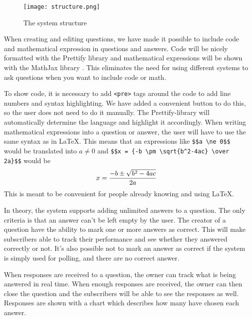 \begin{figure}[H]
\capstart
	\centering
		\texttt{[image: structure.png]}
	\caption[System Structure]{The system structure\label{fig:structure}}
\end{figure}

When creating and editing questions, we have made it possible to include code and mathematical expression in questions and answers. Code will be nicely formatted with the Prettify library \cite{google/code-prettify_2016} and mathematical expressions will be shown with the MathJax library \cite{mathjax_2016}. This eliminates the need for using different systems to ask questions when you want to include code or math. 

To show code, it is necessary to add \texttt{<pre>} tags around the code to add line numbers and syntax highlighting. We have added a convenient button to do this, so the user does not need to do it manually. The Prettify-library will automatically determine the language and highlight it accordingly. When writing mathematical expressions into a question or answer, the user will have to use the same syntax as in \LaTeX. This means that an expressions like \verb|$$a \ne 0$$| would be translated into $a \ne 0$ and \verb|$$x = {-b \pm \sqrt{b^2-4ac} \over 2a}$$| would be 
$$x = {-b \pm \sqrt{b^2-4ac} \over 2a}$$
This is meant to be convenient for people already knowing and using \LaTeX.

In theory, the system supports adding unlimited answers to a question. The only criteria is that an answer can't be left empty by the user. The creator of a question have the ability to mark one or more answers as correct. This will make subscribers able to track their performance and see whether they answered correctly or not. It's also possible not to mark an answer as correct if the system is simply used for polling, and there are no correct answer.

When responses are received to a question, the owner can track what is being answered in real time. When enough responses are received, the owner can then close the question and the subscribers will be able to see the responses as well. Responses are shown with a chart which describes how many have chosen each answer.